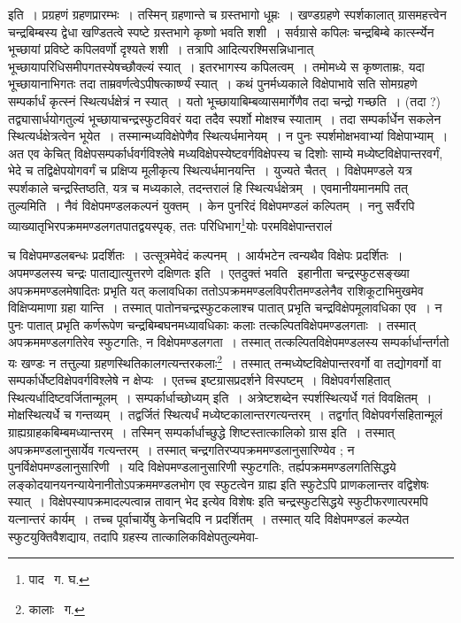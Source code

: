 \documentclass[11pt, openany]{book}
\begin{document}
 \indent इति~। प्रग्रहणं ग्रहणप्रारम्भः~। तस्मिन् ग्रहणान्ते च ग्रस्तभागो धूम्रः~। खण्डग्रहणे स्पर्शकालात् ग्रासमहत्त्वेन चन्द्रबिम्बस्य
द्वेधा खण्डितत्वे स्पष्टे ग्रस्तभागे कृष्णो भवति शशी~। सर्वग्रासे कपिलः चन्द्रबिम्बे कार्त्स्न्येन भूच्छायां प्रविष्टे कपिलवर्णो दृश्यते शशी~।
तत्रापि आदित्यरश्मिसन्निधानात् भूच्छायापरिधिसमीपगतस्येषच्छौक्ल्यं स्यात्~। इतरभागस्य कपिलत्वम्~। तमोमध्ये स कृष्णताम्रः, यदा भूच्छायानाभिगतः तदा ताम्रवर्णत्वेऽपीषत्कार्ष्ण्यं स्यात्~। कथं पुनर्मध्यकाले विक्षेपाभावे सति सोमग्रहणे सम्पर्कार्धं कृत्स्नं स्थित्यर्धक्षेत्रं न स्यात्~। यतो भूच्छायाबिम्बव्यासमार्गेणैव तदा चन्द्रो गच्छति~। (तदा ?) तद्व्यासार्धयोगतुल्यं भूच्छायाचन्द्रस्फुटविवरं यदा तदैव स्पर्शो मोक्षश्च स्याताम्~। तदा सम्पर्कार्धेन सकलेन स्थित्यर्धक्षेत्रत्वेन भूयेत~। तस्मान्मध्यविक्षेपेणैव स्थित्यर्धमानेयम्~। न पुनः स्पर्शमोक्षभवाभ्यां विक्षेपाभ्याम्~। अत एव केचित् विक्षेपसम्पर्कार्धवर्गविश्लेषे मध्यविक्षेपस्येष्टवर्गविक्षेपस्य च दिशोः साम्ये मध्येष्टविक्षेपान्तरवर्गं, भेदे च तद्विक्षेपयोगवर्गं च प्रक्षिप्य मूलीकृत्य स्थित्यर्धमानयन्ति~। युज्यते चैतत्~। विक्षेपमण्डले यत्र स्पर्शकाले चन्द्रस्तिष्ठति, यत्र च मध्यकाले, तदन्तरालं हि स्थित्यर्धक्षेत्रम्~। एवमानीयमानमपि तत् तुल्यमिति~। नैवं विक्षेपमण्डलकल्पनं युक्तम्~। केन पुनरिदं विक्षेपमण्डलं कल्पितम्~। ननु सर्वैरपि व्याख्यातृभिरपक्रममण्डलगतपातद्वयस्पृक्, ततः परिधिभाग\renewcommand{\thefootnote}{१}\footnote{पाद \textendash\ ग. घ.}योः परमविक्षेपान्तरालं 

\newpage

\noindent च विक्षेपमण्डलबन्धः प्रदर्शितः~। उत्सूत्रमेवेदं कल्पनम्~। आर्यभटेन त्वन्यथैव विक्षेपः प्रदर्शितः~। {\qt अपमण्डलस्य चन्द्रः
पाताद्यात्युत्तरणे दक्षिणतः} इति~। एतदुक्तं भवति \textendash\ इहानीता चन्द्रस्फुटसङ्ख्या अपक्रममण्डलमेषादितः प्रभृति यत् कलावधिका ततोऽपक्रममण्डलविपरीतमण्डलेनैव राशिकूटाभिमुखमेव विक्षिप्यमाणा ग्रहा यान्ति~। तस्मात् पातोनचन्द्रस्फुटकलाश्च पातात् प्रभृति चन्द्रविक्षेपमूलावधिका एव~। न पुनः पातात् प्रभृति कर्णरूपेण चन्द्रबिम्बघनमध्यावधिकाः कलाः तत्कल्पितविक्षेपमण्डलगताः~। तस्मात् अपक्रममण्डलगतिरेव स्फुटगतिः, न विक्षेपमण्डलगता~। तस्मात् तत्कल्पितविक्षेपमण्डलस्य सम्पर्कार्धान्तर्गतो यः खण्डः न तत्तुल्या ग्रहणस्थितिकालगत्यन्तरकलाः\renewcommand{\thefootnote}{१}\footnote{कालाः \textendash\ ग.}~। तस्मात् तन्मध्येष्टविक्षेपान्तरवर्गो वा तद्योगवर्गो वा सम्पर्कार्धेष्टविक्षेपवर्गविश्लेषे न क्षेप्यः~। एतच्च इष्टग्रासप्रदर्शने विस्पष्टम्~। {\qt विक्षेपवर्गसहितात्
स्थित्यर्धादिष्टवर्जितान्मूलम्~। सम्पर्कार्धाच्छोध्यम्} इति~। अत्रेष्टशब्देन स्पर्शस्थित्यर्धे गतं विवक्षितम्~। मोक्षस्थित्यर्धे च गन्तव्यम्~। तद्वर्जितं स्थित्यर्धं मध्येष्टकालान्तरगत्यन्तरम्~। तद्वर्गात् विक्षेपवर्गसहितान्मूलं ग्राह्यग्राहकबिम्बमध्यान्तरम्~। तस्मिन् सम्पर्कार्धाच्छुद्धे शिष्टस्तात्कालिको ग्रास इति~। तस्मात् अपक्रमण्डलानुसार्येव गत्यन्तरम्~। तस्मात् चन्द्रगतिरप्यपक्रममण्डलानुसारिण्येव ; न पुनर्विक्षेपमण्डलानुसारिणी~। यदि विक्षेपमण्डलानुसारिणी स्फुटगतिः, तर्ह्यपक्रममण्डलगतिसिद्धये लङ्कोदयानयनन्यायेनानीतोऽपक्रममण्डलभोग एव स्फुटत्वेन ग्राह्य इति स्फुटेऽपि प्राणकलान्तर वद्विशेषः स्यात्~। विक्षेपस्यापक्रमादल्पत्वान्न तावान् भेद इत्येव विशेषः इति चन्द्रस्फुटसिद्धये स्फुटीफरणात्परमपि यत्नान्तरं कार्यम्~। तच्च पूर्वाचार्येषु केनचिदपि न प्रदर्शितम्~। तस्मात् यदि विक्षेपमण्डलं कल्प्येत स्फुटयुक्तिवैशद्याय, तदापि ग्रहस्य तात्कालिकविक्षेपतुल्यमेवा-
 
\end{document}
